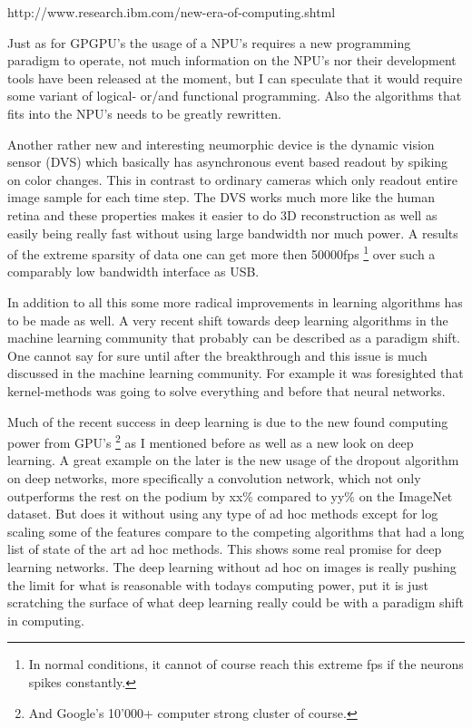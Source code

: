 \documentclass{article}
\begin{document}
    http://www.research.ibm.com/new-era-of-computing.shtml 

    Just as for GPGPU's the usage of a NPU's requires a new programming 
    paradigm to operate, not much information on the NPU's nor their 
    development tools have been released at the moment, but I can speculate 
    that it would require some variant of logical- or/and functional 
    programming. Also the algorithms that fits into the NPU's needs to be 
    greatly rewritten.
    
    Another rather new and interesting neumorphic device is the
    dynamic vision sensor (DVS) which basically has asynchronous event based
    readout by spiking on color changes.\cite{dvs} This in contrast to ordinary
    cameras which only readout entire image sample for each time step. 
    The DVS works much more like the human retina and
    these properties makes it easier to do 3D reconstruction as well as easily
    being really fast without using large bandwidth nor much power. A results
    of the extreme sparsity of data one can get more then 50000fps
    \footnote{In normal conditions, it cannot of course reach this extreme fps
    if the neurons spikes constantly.}
    over such a comparably low bandwidth interface as USB.

    In addition to all this some more radical improvements in learning
    algorithms has to be made as well. A very recent shift towards deep
    learning algorithms in the machine learning community that probably can be
    described as a paradigm shift. One cannot say for sure until after the
    breakthrough and this issue is much discussed in the machine learning
    community. For example it was foresighted that kernel-methods was going to
    solve everything and before that neural networks.
   
    Much of the recent success in deep learning is due to the new found 
    computing power from GPU's
    \footnote{And Google's 10'000+ computer strong cluster of course.} 
    as I mentioned before as well as a new look on deep learning. A great 
    example on the later is the new usage of the dropout algorithm on deep 
    networks, more specifically a convolution network, which not only 
    outperforms the rest on the podium by xx\% compared to yy\% on the ImageNet 
    dataset.\cite{imagenet}
    But does it without using any type of ad hoc methods except for log scaling 
    some of the features compare to the competing algorithms that had a long 
    list of state of the art ad hoc methods.\cite{dropout} This shows some real 
    promise for deep learning networks. The deep learning without ad hoc on
    images is really pushing the limit for what is reasonable with todays
    computing power, put it is just scratching the surface of what deep
    learning really could be with a paradigm shift in computing.
\end{document}
